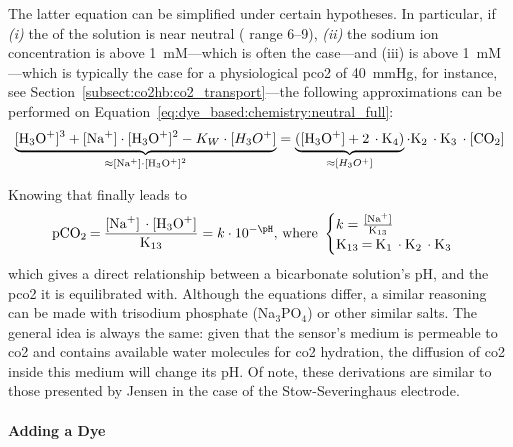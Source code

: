 The latter equation can be simplified under certain hypotheses. In particular, if \textit{(i)} the \pH{} of the solution is near neutral (\pH{} range 6--9), \textit{(ii)} the sodium  ion concentration is above 1~mM---which is often the case\cite{opitz1984, zhujun1984b}---and (iii) \ce{[CO_2]} is above 1~mM---which is typically the case for a physiological \gls{pco2} of 40~mmHg, for instance, see Section~\ref{subsect:co2hb:co2_transport}---the following approximations can be performed on Equation~\ref{eq:dye_based:chemistry:neutral_full}:
\begin{equation}
	\underbrace{\ce{[H_3O^+]^3 + [Na^+]\cdot[H_3O^+]^2}- K_W \cdot [H_3O^+]}_{\approx \ce{[Na^+]\cdot [H_3O^+]^2}} = \underbrace{(\ce{[H_3O^+] + 2 \cdot K_4})}_{\approx [H_3O^+]}\cdot \ce{K_2 \cdot K_3 \cdot [CO_2]}
\end{equation}

Knowing that  finally leads to
\begin{equation}\label{eq:choos:dye_based:chemistry:pco2_pH_link}
	\ce{pCO_2 = \frac{[Na^+] \cdot [H_3O^+]}{K_13}} = k \cdot 10^{-\pH}\text{, where }
	\begin{cases}
		k = \ce{\frac{[Na^+]}{K_13}}\\
		\ce{K_{13} = K_1 \cdot K_2 \cdot K_3}
	\end{cases}
\end{equation}
which gives a direct relationship between a bicarbonate solution's pH, and the \gls{pco2} it is equilibrated with. Although the equations differ, a similar reasoning can be made with trisodium phosphate (Na$_3$PO$_4$) or other similar salts. The general idea is always the same: given that the sensor's medium is permeable to \gls{co2} and contains available water molecules for \gls{co2} hydration, the diffusion of \gls{co2} inside this medium will change its pH. Of note, these derivations are similar to those presented by Jensen \etal{} in the case of the Stow-Severinghaus electrode\cite{jensen1979}.

\paragraph{Adding a Dye}\mbox{}\\

